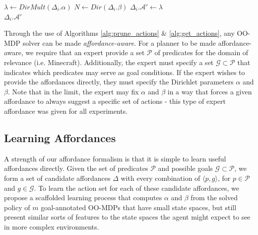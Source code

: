 \documentclass[conference]{IEEEtran}
\begin{document}
\begin{algorithm}
  \caption{$\Delta_i.getActions(s)$}
  \begin{algorithmic}[1]
    \State $\lambda \leftarrow DirMult(\Delta_i.\alpha)$
    \State $N \leftarrow Dir(\Delta_i.\beta)$
    \State $\Delta_i.\mathcal{A}' \leftarrow \lambda$
    \EndFor \\
    \Return $\Delta_i.\mathcal{A}'$
  \end{algorithmic}
  \label{alg:get_actions}
\end{algorithm}

Through the use of Algorithms \ref{alg:prune_actions} \& \ref{alg:get_actions}, any OO-MDP solver can be made
{\it affordance-aware}. For a planner to be made affordance-aware, we require that an expert provide a set $\mathcal{P}$ of predicates
for the domain of relevance (i.e. Minecraft). Additionally, the expert must specify a set
$\mathcal{G} \subset \mathcal{P}$ that indicates which predicates may serve as goal conditions. If the expert wishes
to provide the affordances directly, they must specify the Dirichlet parameters $\alpha$ and $\beta$. Note that
in the limit, the expert may fix $\alpha$ and $\beta$ in a way that forces a given
affordance to always suggest a specific set of actions - this type of expert affordance was given for all
experiments.

\subsection{Learning Affordances}

A strength of our affordance formalism is that it is simple to learn useful affordances directly.
Given the set of predicates $\mathcal{P}$ and possible goals $\mathcal{G} \subset \mathcal{P}$, we form a set of candidate affordances $\Delta$ with every combination of $\langle p, g \rangle$, for $p \in \mathcal{P}$ and $g \in \mathcal{G}$.
To learn the action set for each of these candidate affordances, we propose a scaffolded learning process that computes $\alpha$ and $\beta$ from the
solved policy of $m$ goal-annotated OO-MDPs that have small state spaces, but still present similar sorts of features to the state spaces the agent might expect to see in more complex environments.



\end{document}
